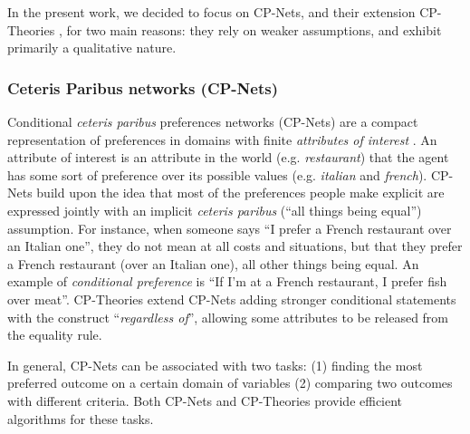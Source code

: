 In the present work, we decided to focus on CP-Nets, and their extension CP-Theories \cite{Wilson2004}, for two main reasons: they rely on weaker assumptions, and exhibit primarily a qualitative nature. 


\subsubsection*{Ceteris Paribus networks (CP-Nets) }
Conditional \textit{ceteris paribus}  preferences networks (CP-Nets) are a compact representation of preferences in domains with finite \textit{attributes of interest} \cite{Boutilier2004}. An attribute of interest is an attribute in the world (e.g. \textit{restaurant}) that the agent has some sort of preference over its possible values (e.g. \textit{italian} and \textit{french}). CP-Nets build upon the idea that most of the preferences people make explicit are expressed jointly with an implicit \textit{ceteris paribus} (``all things being equal'') assumption. For instance, when someone says ``I prefer a French restaurant over an Italian one'', they do not mean at all costs and situations, but that they prefer a French restaurant (over an Italian one), all other things being equal. An example of \textit{conditional preference} is ``If I'm at a French restaurant, I prefer fish over meat''.
CP-Theories \cite{Wilson2004} extend CP-Nets adding stronger conditional statements with the construct ``\textit{regardless of}'', allowing some attributes to be released from the equality rule. 

In general, CP-Nets can be associated with two tasks: (1) finding the most preferred outcome on a certain domain of variables (2) comparing two outcomes with different criteria. Both CP-Nets and CP-Theories provide efficient algorithms for these tasks.


